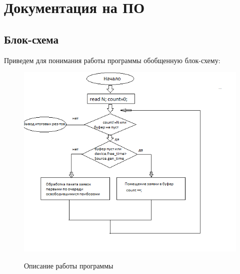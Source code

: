 \documentclass{article}
\begin{document}
	\section{Документация на ПО}
	\subsection{Блок-схема}
	Приведем для понимания работы программы обобщенную блок-схему:
	\begin{figure}[!htbp]
	\centering
	\includegraphics[width=\textwidth,height=\textheight,keepaspectratio]{smo1.png}\\
	\caption{Описание работы программы}
	\end{figure}
\end{document}
